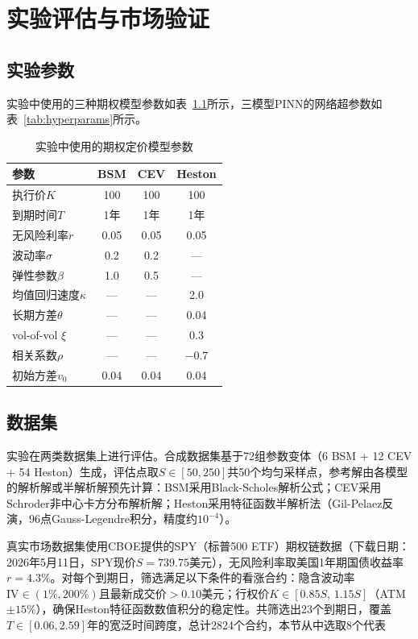\chapter{实验评估与市场验证}\label{chap:experiment}

\section{实验参数}\label{sec:exp_params}

实验中使用的三种期权模型参数如表~\ref{tab:model_params}所示，三模型PINN的网络超参数如表~\ref{tab:hyperparams}所示。

\begin{table}[H]
  \centering
  \caption{实验中使用的期权定价模型参数}
  \label{tab:model_params}
  \begin{tabular}{p{5cm}ccc}
    \hline
    参数 & BSM & CEV & Heston \\
    \hline
    执行价$K$ & 100 & 100 & 100 \\
    到期时间$T$ & 1年 & 1年 & 1年 \\
    无风险利率$r$ & 0.05 & 0.05 & 0.05 \\
    波动率$\sigma$ & 0.2 & 0.2 & --- \\
    弹性参数$\beta$ & 1.0 & 0.5 & --- \\
    均值回归速度$\kappa$ & --- & --- & 2.0 \\
    长期方差$\theta$ & --- & --- & 0.04 \\
    vol-of-vol $\xi$ & --- & --- & 0.3 \\
    相关系数$\rho$ & --- & --- & $-0.7$ \\
    初始方差$v_0$ & 0.04 & 0.04 & 0.04 \\
    \hline
  \end{tabular}
\end{table}

\section{数据集}\label{sec:exp_data}

实验在两类数据集上进行评估。合成数据集基于72组参数变体（6 BSM + 12 CEV + 54 Heston）生成，评估点取$S\in[50,250]$共50个均匀采样点，参考解由各模型的解析解或半解析解预先计算：BSM采用Black-Scholes解析公式；CEV采用Schroder非中心卡方分布解析解\cite{schroder1989computing}；Heston采用特征函数半解析法（Gil-Pelaez反演，96点Gauss-Legendre积分，精度约$10^{-4}$）。

真实市场数据集使用CBOE提供的SPY（标普500 ETF）期权链数据（下载日期：2026年5月11日，SPY现价$S=739.75$美元），无风险利率取美国1年期国债收益率$r=4.3\%$。对每个到期日，筛选满足以下条件的看涨合约：隐含波动率$\text{IV}\in(1\%, 200\%)$且最新成交价$>0.10$美元；行权价$K\in[0.85S,\,1.15S]$（ATM $\pm15\%$），确保Heston特征函数数值积分的稳定性。共筛选出23个到期日，覆盖$T\in[0.06, 2.59]$年的宽泛时间跨度，总计2824个合约，本节从中选取8个代表




